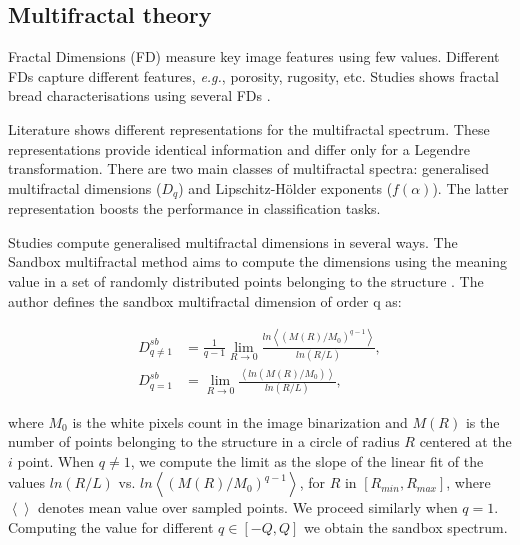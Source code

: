 \subsection{Multifractal theory}

Fractal Dimensions (FD) measure key image features using few values. Different FDs capture different features, {\em e.g.}, porosity, rugosity, etc. Studies shows fractal bread characterisations using several FDs \cite{Gonzales2008,Baravalle2012}. 

Literature shows different representations for the multifractal spectrum. These representations provide identical information and differ only for a Legendre transformation. There are two main classes of multifractal spectra: generalised multifractal dimensions ($D_{q}$) and Lipschitz-H\"older exponents ($f(\alpha)$). The latter representation boosts the performance in classification tasks.

Studies compute generalised multifractal dimensions in several ways. The Sandbox multifractal method \cite{Tel1989} aims to compute the dimensions using the meaning value in a set of randomly distributed points belonging to the structure \cite{Debartolo2004}. The author defines the sandbox multifractal dimension of order q as:

 \begin{align}
D_{q\ne 1}^{sb} &= \frac{1}{q-1} \lim_{R \rightarrow 0}{
\frac{ln   { \left\langle  (M(R)/M_{0})^{q-1} \right\rangle   }}
{ln {(R/L)}       }},\\
D_{q=1}^{sb} &= \lim_{R \rightarrow 0}{
\frac{ \left\langle ln   { (M(R)/M_{0})  }  \right\rangle}
{ln {(R/L)}       }},
\end{align}

\noindent where $M_{0}$ is the white pixels count in the image binarization and  $M(R)$ is the number of points belonging to the structure in a circle of radius $R$ centered at the $i$ point. When $q\ne1$, we compute the limit as the slope of the linear fit of the values $ln(R/L)$ vs. $ ln  \left\langle  { (M(R)/M_{0})^{q-1}  }  \right\rangle$, for $R$ in $[R_{min}, R_{max}]$, where $ \left\langle   \right\rangle$ denotes mean value over sampled points. We proceed similarly when $q=1$. Computing the value for different $q \in [-Q,Q]$  we obtain the sandbox spectrum.


